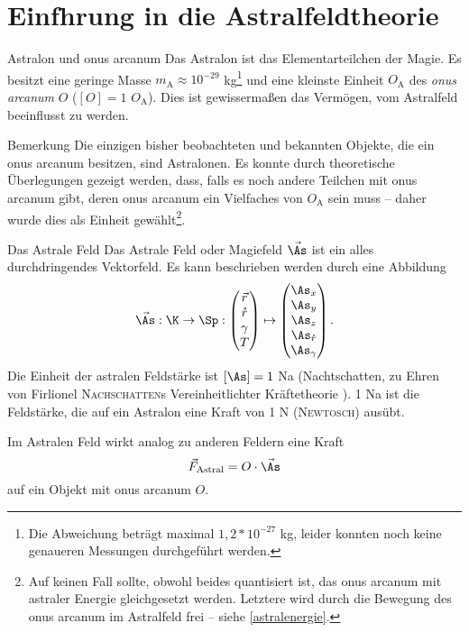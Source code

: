 \section[tocentry=Einführung in die Astralfeldtheorie, head=Einführung in die Astralfeldtheorie]{Einf\uese hrung in die Astralfeldtheorie}
\begin{bla}{Astralon und onus arcanum}
Das Astralon ist das Elementarteilchen der Magie. Es besitzt eine geringe Masse $m_\text{A}\approx10^{-29}$ kg\footnote{Die Abweichung beträgt maximal $1,2*10^{-27}$ kg, leider konnten noch keine genaueren Messungen durchgeführt werden.} und eine kleinste Einheit $O_\text{A}$ des \emph{onus arcanum} $O$ ($[O]=1$ $O_\text{A}$). Dies ist gewissermaßen das Vermögen, vom Astralfeld beeinflusst zu werden.
\end{bla}
\begin{bla}{Bemerkung}
Die einzigen bisher beobachteten und bekannten Objekte, die ein onus arcanum besitzen, sind Astralonen. Es konnte durch theoretische Überlegungen \cite{quanten} gezeigt werden, dass, falls es noch andere Teilchen mit onus arcanum gibt, deren onus arcanum ein Vielfaches von $O_\text{A}$ sein muss -- daher wurde dies als Einheit gewählt\footnote{Auf keinen Fall sollte, obwohl beides quantisiert ist, das onus arcanum mit astraler Energie gleichgesetzt werden. Letztere wird durch die Bewegung des onus arcanum im Astralfeld frei -- siehe \ref{astralenergie}.}.
\end{bla}
\begin{bla}{Das Astrale Feld}
Das Astrale Feld oder Magiefeld $\vec{\As}$ ist ein alles durchdringendes Vektorfeld. Es kann beschrieben werden durch eine Abbildung
\begin{equation}
\vec{\As}: \K\to\Sp: \begin{pmatrix}\vec{r}\\\mathring{r}\\\gamma\\T\end{pmatrix}\mapsto\begin{pmatrix}\As_x\\\As_y\\\As_z\\\As_{\mathring{r}}\\\As_\gamma\end{pmatrix}\text{.}
\end{equation}
Die Einheit der astralen Feldstärke ist $[\As]=1$ Na (Nachtschatten, zu Ehren von Firlionel \textsc{Nachschatten}s Vereinheitlichter Kräftetheorie \cite{nachtschatten}). 1 Na ist die Feldstärke, die auf ein Astralon eine Kraft von 1 N (\textsc{Newtosch}) ausübt.

Im Astralen Feld wirkt analog zu anderen Feldern eine Kraft
\begin{equation}
\vec{F}_\text{Astral}=O\cdot\vec{\As}\label{eq:astralkraft}
\end{equation}
auf ein Objekt mit onus arcanum $O$.
\end{bla}
